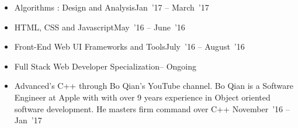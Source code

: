 \documentclass[10pt,a4paper]{article}
\begin{document}
\spacedhrule{0.5em}{-0.4em}
{}
{}
{}


\spacedhrule{0.5em}{-0.4em}

\vspace{0.15cm}
\begin{itemize}[labelindent=1.5em,labelsep=-0.3cm,leftmargin=*]
\item \headedsubsection 
    {Algorithms : Design and Analysis}{{{Jan~'17 -- March~'17}}}
    {}
    
\item \headedsubsection 
    {HTML, CSS and Javascript}{{{May~'16 -- June~'16}}}
    {}
    
\item \headedsubsection 
    {Front-End Web UI Frameworks and Tools}{{{July~'16 -- August~'16}}}
    {}

\item \headedsubsection 
    {Full Stack Web Developer Specialization}{{{-- Ongoing}}}
    {}


\item \headedsubsection  %
  {{\normalfont Advanced's C++ through Bo Qian's YouTube channel. Bo Qian is a Software Engineer at Apple with with over 9 years experience in Object oriented software development. He masters firm command over C++ }}{{{November~'16 -- Jan~'17}}}
  
\end{itemize}


\spacedhrule{0.5em}{-0.4em}
\end{document}

